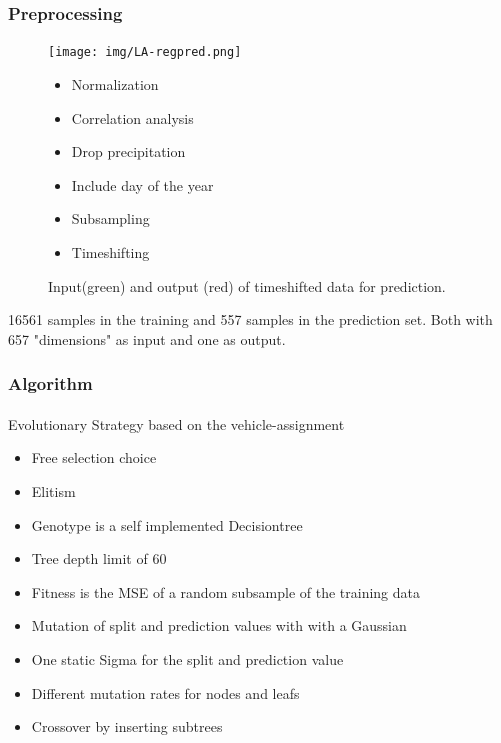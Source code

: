 \documentclass{beamer}
\begin{document}
\begin{frame}[fragile]
\frametitle{Preprocessing}
\framesubtitle{}


\begin{figure}[H]

\begin{minipage}{.5\textwidth}
  \centering
  \texttt{[image: img/LA-regpred.png]}
  \caption{Input(green) and output (red) of timeshifted data for prediction.}
\end{minipage}%
\begin{minipage}{.5\textwidth}
	\begin{itemize}
	\item Normalization
	\item Correlation analysis
	\item Drop precipitation
	\item Include day of the year
	\item Subsampling
	\item Timeshifting\cite{vafaeipour2014application}
	\end{itemize}
\end{minipage}%
\end{figure}
\hbox{}
16561 samples in the training and 557 samples in the prediction set. Both with 657 "dimensions" as input and one as output.

\end{frame}


\begin{frame}[fragile]
\frametitle{Algorithm}
\framesubtitle{}

\begin{block}{Evolutionary Strategy}
based on the vehicle-assignment\\
\hbox{}
\begin{itemize}
\item Free selection choice
\item Elitism
\item Genotype is a self implemented Decisiontree
\item Tree depth limit of 60
\item Fitness is the MSE of a random subsample of the training data
\item Mutation of split and prediction values with with a Gaussian
\item One static Sigma for the split and prediction value
\item Different mutation rates for nodes and leafs
\item Crossover by inserting subtrees
\end{itemize}
\end{block}

\end{frame}
\end{document}
